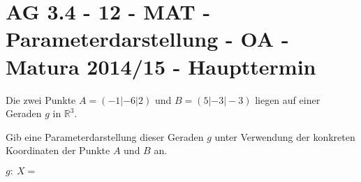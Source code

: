 \section{AG 3.4 - 12 - MAT - Parameterdarstellung - OA - Matura 2014/15 - Haupttermin}

\begin{beispiel}[AG 3.4]{1} %
Die zwei Punkte $A = (-1| -6|2)$ und $B = (5| -3|-3)$ liegen auf einer Geraden $g$ in $\mathbb{R}^3$. \leer

Gib eine Parameterdarstellung dieser Geraden $g$ unter Verwendung der konkreten Koordinaten
der Punkte $A$ und $B$ an. \leer

$g:~X=$ 
\end{beispiel}